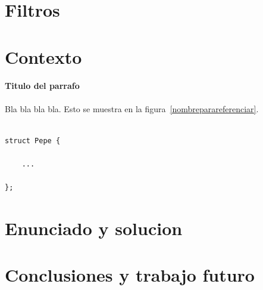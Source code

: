 \documentclass[a4paper]{article}
\newenvironment{codesnippet}{%
	\begin{Sbox}\begin{minipage}{\textwidth}\sffamily\small}%
	{\end{minipage}\end{Sbox}%
		\begin{center}%
		\vspace{-0.4cm}\colorbox{litegrey}{\TheSbox}\end{center}\vspace{0.3cm}}
\begin{document}
\section{Filtros}






\section{Contexto}


\paragraph{\textbf{Titulo del parrafo} } Bla bla bla bla.
Esto se muestra en la figura~\ref{nombreparareferenciar}.



\begin{codesnippet}
\begin{verbatim}

struct Pepe {

    ...

};

\end{verbatim}
\end{codesnippet}


\section{Enunciado y solucion} 
%
%

\section{Conclusiones y trabajo futuro}
\end{document}
